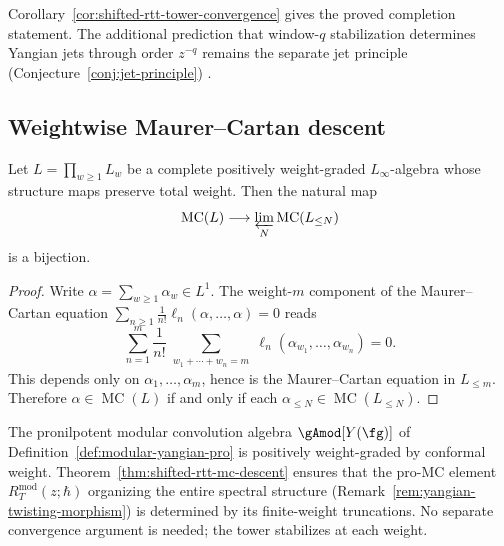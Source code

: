 \begin{remark}
\label{rem:shifted-rtt-tower-convergence-jet}
Corollary~\ref{cor:shifted-rtt-tower-convergence} gives the proved
completion statement. The additional prediction that window-$q$
stabilization determines Yangian jets through order $z^{-q}$ remains
the separate jet principle
\ifannalsedition\else
(Conjecture~\ref{conj:jet-principle})
\fi.
\end{remark}


\subsection{Weightwise Maurer--Cartan descent}
\label{subsec:weightwise-mc-descent}

\begin{theorem}
\label{thm:shifted-rtt-mc-descent}
Let $L = \prod_{w \ge 1} L_w$ be a complete positively weight-graded
$L_\infty$-algebra whose structure maps preserve total weight. Then
the natural map
\[
\operatorname{MC}(L) \longrightarrow
\varprojlim_N \operatorname{MC}(L_{\le N})
\]
is a bijection.
\end{theorem}

\begin{proof}
Write $\alpha = \sum_{w \ge 1} \alpha_w \in L^1$. The
weight-$m$ component of the Maurer--Cartan equation
$\sum_{n \ge 1} \frac{1}{n!}\ell_n(\alpha,\ldots,\alpha) = 0$
reads
\[
\sum_{n=1}^{m} \frac{1}{n!}
\sum_{\substack{w_1 + \cdots + w_n = m}}
\ell_n(\alpha_{w_1},\ldots,\alpha_{w_n}) = 0.
\]
This depends only on $\alpha_1,\ldots,\alpha_m$, hence is the
Maurer--Cartan equation in $L_{\le m}$. Therefore
$\alpha \in \operatorname{MC}(L)$ if and only if each
$\alpha_{\le N} \in \operatorname{MC}(L_{\le N})$.
\end{proof}

\begin{remark}
\label{rem:mc-descent-pro-yangian}
The pronilpotent modular convolution algebra
$\gAmod[Y(\fg)]$ of
Definition~\ref{def:modular-yangian-pro}
is positively weight-graded by conformal weight.
Theorem~\ref{thm:shifted-rtt-mc-descent} ensures that
the pro-MC element $R_T^{\mathrm{mod}}(z;\hbar)$ organizing
the entire spectral structure
(Remark~\ref{rem:yangian-twisting-morphism}) is determined by
its finite-weight truncations. No separate convergence argument
is needed; the tower stabilizes at each weight.
\end{remark}



